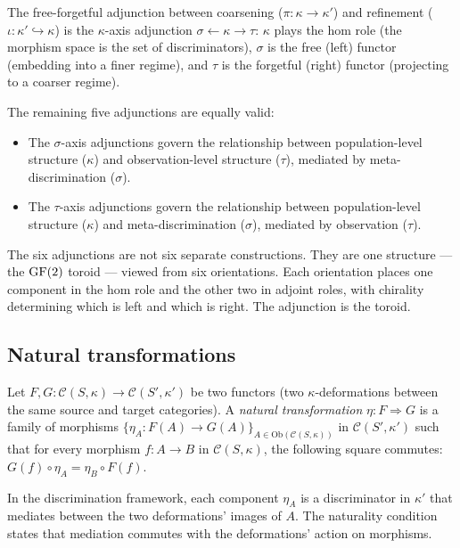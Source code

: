 \begin{corollary}
\label{cor:free-fgt}
The free-forgetful adjunction between coarsening
($\pi: \kappa \to \kappa'$) and refinement
($\iota: \kappa' \hookrightarrow \kappa$) is the
$\kappa$-axis adjunction $\sigma \leftarrow \kappa \to \tau$:
$\kappa$ plays the hom role (the morphism space is the
set of discriminators), $\sigma$ is the free (left) functor
(embedding into a finer regime), and $\tau$ is the
forgetful (right) functor (projecting to a coarser regime).

The remaining five adjunctions are equally valid:
\begin{itemize}[nosep]
  \item The $\sigma$-axis adjunctions govern the relationship
    between population-level structure ($\kappa$) and
    observation-level structure ($\tau$), mediated by
    meta-discrimination ($\sigma$).
  \item The $\tau$-axis adjunctions govern the relationship
    between population-level structure ($\kappa$) and
    meta-discrimination ($\sigma$), mediated by
    observation ($\tau$).
\end{itemize}
\end{corollary}

\begin{remark}
The six adjunctions are not six separate constructions.
They are one structure --- the $\operatorname{GF}(2)$ toroid --- viewed
from six orientations. Each orientation places one
component in the hom role and the other two in adjoint
roles, with chirality determining which is left and which
is right. The adjunction is the toroid.
\end{remark}

\subsection{Natural transformations}\label{sec:nattrans}

\begin{definition}\label{def:nattrans}
Let $F, G: \mathcal{C}(S,\kappa) \to \mathcal{C}(S',\kappa')$
be two functors (two $\kappa$-deformations between the same
source and target categories). A \emph{natural transformation}
$\eta: F \Rightarrow G$ is a family of morphisms
$\{\eta_A: F(A) \to G(A)\}_{A \in \mathrm{Ob}(\mathcal{C}(S,\kappa))}$
in $\mathcal{C}(S',\kappa')$ such that for every morphism
$f: A \to B$ in $\mathcal{C}(S,\kappa)$, the following
square commutes:
$G(f) \circ \eta_A = \eta_B \circ F(f)$.

In the discrimination framework, each component $\eta_A$ is
a discriminator in $\kappa'$ that mediates between the
two deformations' images of $A$. The naturality condition
states that mediation commutes with the deformations'
action on morphisms.
\end{definition}

